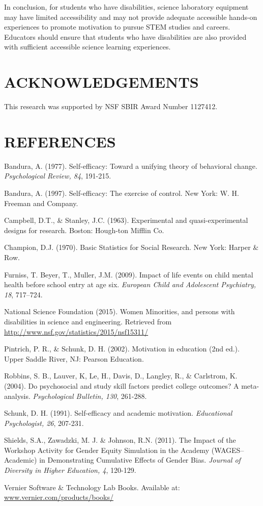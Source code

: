 \documentclass[11.5pt]{sig-alternate} %
\begin{document}
\begin{large}
In conclusion, for students who have disabilities, science laboratory equipment may have limited accessibility and may not provide adequate accessible hands-on experiences to promote motivation to pursue STEM studies and careers. Educators should ensure that students who have disabilities are also provided with sufficient accessible science learning experiences. 

\section*{ACKNOWLEDGEMENTS}

This research was supported by NSF SBIR Award Number 1127412.

\end{large}
\clearpage
\section*{REFERENCES}\par 

\leftskip 0.25in
\parindent -0.25in 

Bandura, A. (1977). Self-efficacy: Toward a unifying theory of behavioral change. \textit{Psychological Review, 84}, 191-215. 

Bandura, A. (1997). Self-efficacy: The exercise of control. New York: W. H. Freeman and Company. 

Campbell, D.T., \& Stanley, J.C. (1963). Experimental and quasi-experimental designs for research. Boston: Hough-ton Mifflin Co. 

Champion, D.J. (1970). Basic Statistics for Social Research. New York: Harper \& Row.

Furniss, T. Beyer, T., Muller, J.M. (2009). Impact of life events on child mental health before school entry at age six. \textit{European Child and Adolescent Psychiatry, 18}, 717–724.

National Science Foundation (2015). Women Minorities, and persons with disabilities in science and engineering. Retrieved from \url{http://www.nsf.gov/statistics/2015/nsf15311/}

Pintrich, P. R., \& Schunk, D. H. (2002). Motivation in education (2nd ed.). Upper Saddle River, NJ: Pearson Education. 

Robbins, S. B., Lauver, K, Le, H., Davis, D., Langley, R., \& Carlstrom, K. (2004). Do psychosocial and study skill factors predict college outcomes? A meta-analysis. \textit{Psychological Bulletin, 130}, 261-288. 

Schunk, D. H. (1991). Self-efficacy and academic motivation. \textit{Educational Psychologist, 26}, 207-231.  

Shields, S.A., Zawadzki, M. J. \& Johnson, R.N. (2011). The Impact of the Workshop Activity for Gender Equity Simulation in the Academy (WAGES–Academic) in Demonstrating Cumulative Effects of Gender Bias. \textit{Journal of Diversity in Higher Education, 4}, 120-129.

Vernier Software \& Technology Lab Books. Available at: \url{www.vernier.com/products/books/}
\end{document}
